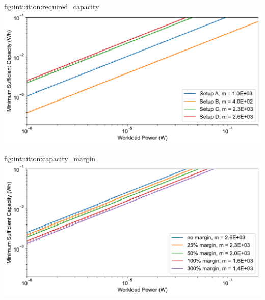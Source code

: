 \begin{definefigure}{fig:intuition:required_capacity}
    \centering
    \includegraphics[width=\columnwidth]{figs/chap3/required_capacity.pdf}
    \caption{
    The minimum sufficient capacity to support an average workload power, assuming an identical average income power. Note the x- and y-axis log scale. The average workload and income power are set equal; however the variability of income power is determined by the synthetic EnHANTs traces. The minimum sufficient capacity follows a linear trend with increasing income and workload power. Even though each line appears parallel, lines that are higher up on the y-axis actually have a larger slope due to the log-log scale.
    }
\end{definefigure}

\begin{definefigure}{fig:intuition:capacity_margin}
    \centering
    \includegraphics[width=\columnwidth]{figs/chap3/capacity_margin.pdf}
    \caption{
    The impact of workload margin on the minimum sufficient capacity. Traces synthesized from Setup D are considered, and are scaled by an income power. Six different workload margins are considered. The zero margin corresponds to the workload power being equal to the average income power. The $0.2$ margin represents the workload power requiring 80\% the power provided by the average income, for example.
    As the margin increases, the ratio of the average workload power to the income power decreases. With a higher margin there is less energy that must be captured to satisfy the workload and the minimum sufficient capacity decreases.
    }
\end{definefigure}

